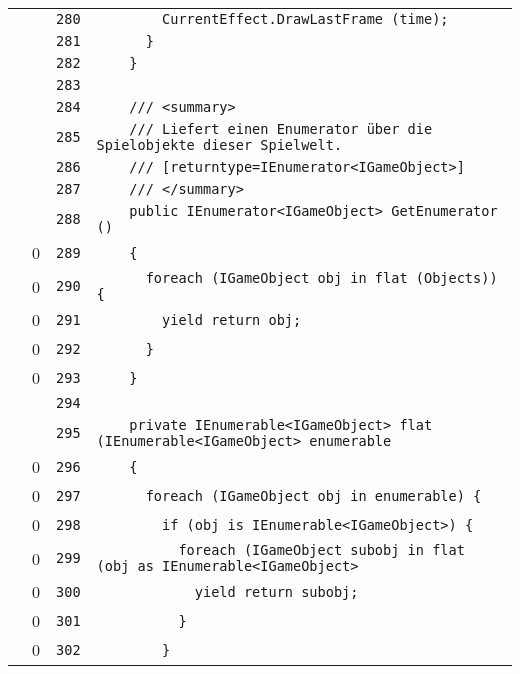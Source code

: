 \documentclass[a4paper,10pt]{article}
\begin{document}
\begin{longtable}[l]{lrrl}
\cellcolor{gray} &  & \verb~280~ & \verb~        CurrentEffect.DrawLastFrame (time);~\\
\cellcolor{gray} &  & \verb~281~ & \verb~      }~\\
\cellcolor{gray} &  & \verb~282~ & \verb~    }~\\
\cellcolor{gray} &  & \verb~283~ & \verb~~\\
\cellcolor{gray} &  & \verb~284~ & \verb~    /// <summary>~\\
\cellcolor{gray} &  & \verb~285~ & \verb~    /// Liefert einen Enumerator über die Spielobjekte dieser Spielwelt.~\\
\cellcolor{gray} &  & \verb~286~ & \verb~    /// [returntype=IEnumerator<IGameObject>]~\\
\cellcolor{gray} &  & \verb~287~ & \verb~    /// </summary>~\\
\cellcolor{gray} &  & \verb~288~ & \verb~    public IEnumerator<IGameObject> GetEnumerator ()~\\
\cellcolor{red} & 0 & \verb~289~ & \verb~    {~\\
\cellcolor{red} & 0 & \verb~290~ & \verb~      foreach (IGameObject obj in flat (Objects)) {~\\
\cellcolor{red} & 0 & \verb~291~ & \verb~        yield return obj;~\\
\cellcolor{red} & 0 & \verb~292~ & \verb~      }~\\
\cellcolor{red} & 0 & \verb~293~ & \verb~    }~\\
\cellcolor{gray} &  & \verb~294~ & \verb~~\\
\cellcolor{gray} &  & \verb~295~ & \verb~    private IEnumerable<IGameObject> flat (IEnumerable<IGameObject> enumerable~\\
\cellcolor{red} & 0 & \verb~296~ & \verb~    {~\\
\cellcolor{red} & 0 & \verb~297~ & \verb~      foreach (IGameObject obj in enumerable) {~\\
\cellcolor{red} & 0 & \verb~298~ & \verb~        if (obj is IEnumerable<IGameObject>) {~\\
\cellcolor{red} & 0 & \verb~299~ & \verb~          foreach (IGameObject subobj in flat (obj as IEnumerable<IGameObject>~\\
\cellcolor{red} & 0 & \verb~300~ & \verb~            yield return subobj;~\\
\cellcolor{red} & 0 & \verb~301~ & \verb~          }~\\
\cellcolor{red} & 0 & \verb~302~ & \verb~        }~\\

\end{longtable}
\end{document}
